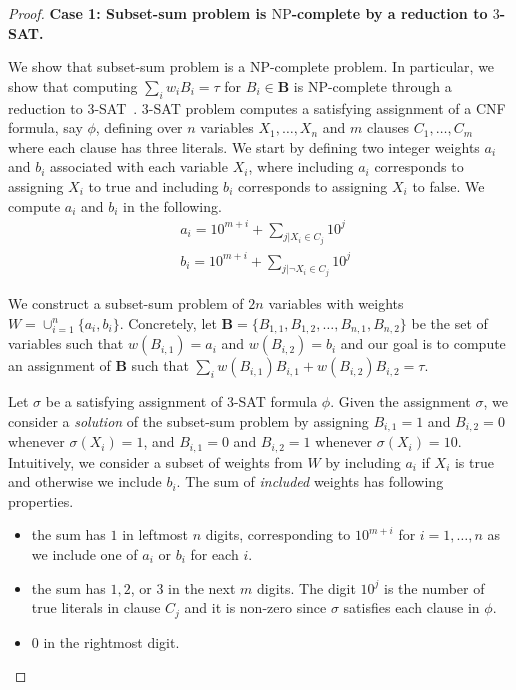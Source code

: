		\begin{proof}
			
			\textbf{Case 1: Subset-sum problem is $ \mathrm{NP} $-complete by a reduction to $ 3 $-SAT.}
			
			We show that subset-sum problem is a $ \mathrm{NP} $-complete problem. In particular, we show that computing $ \sum_{i} w_iB_i = \tau $ for $ B_i \in\mathbf{B}$ is $ \mathrm{NP} $-complete through a reduction to $ 3 $-SAT~\cite{kleinberg2006algorithm}. $ 3 $-SAT problem computes a satisfying assignment of  a CNF formula, say $ \phi $, defining over $ n $ variables $ X_1, \dots, X_n $ and $ m $ clauses $ C_1, \dots, C_m $ where each clause has three literals. We start by defining two integer weights $ a_i $ and $ b_i $ associated with each variable $ X_i $, where including $ a_i $ corresponds to assigning $ X_i $ to true and including $ b_i $ corresponds to assigning $ X_i $ to false. We compute $ a_i $ and $ b_i $ in the following. 
			\begin{align*}
				&a_i = 10^{m+i} + \sum_{j|X_i \in C_j} 10^j\\
				&b_i = 10^{m+i} + \sum_{j|\neg X_i \in C_j} 10^j
			\end{align*}
			
			We construct a subset-sum problem of $ 2n $ variables with weights $ W =  \cup_{i=1}^n\{a_i, b_i\} $. Concretely, let $\mathbf{B}= \{B_{1,1}, B_{1,2}, \dots, B_{n,1}, B_{n,2}\} $ be the set of variables such that $ w(B_{i,1}) = a_i $ and $ w(B_{i,2}) = b_i $ and our goal is to compute an assignment of $\mathbf{B}$ such that $ \sum_{i} w(B_{i,1})B_{i,1} + w(B_{i,2})B_{i,2} = \tau $.
			
			
			Let $ \sigma $ be a satisfying assignment of $ 3 $-SAT formula $ \phi $. Given the assignment $\sigma$, we consider a \textit{solution} of the subset-sum problem by assigning $ B_{i, 1} = 1 $ and $ B_{i, 2} = 0 $ whenever $ \sigma(X_i) = 1 $, and $ B_{i, 1} = 0 $ and $ B_{i, 2} = 1 $ whenever $ \sigma(X_i) = 10 $. Intuitively, 
			we consider a subset of weights from $ W $ by including 
			 $ a_i $ if $ X_i $ is true and otherwise we include $ b_i $.  
			 The sum of \textit{included} weights has following properties. 
			\begin{itemize}
				\item  the sum has $ 1 $ in leftmost $ n $ digits, corresponding to $ 10^{m+i} $ for $ i = 1, \dots, n $ as we include one of $ a_i $ or $ b_i $ for each $ i $. 
				\item the sum has $ 1, 2 $, or $ 3 $ in the next $ m $ digits. The digit $ 10^j $ is the number of true literals in clause $ C_j $ and it is non-zero since $ \sigma $ satisfies each clause in  $ \phi $.
				\item $ 0 $ in the rightmost digit.
			\end{itemize}
		

\end{proof}
